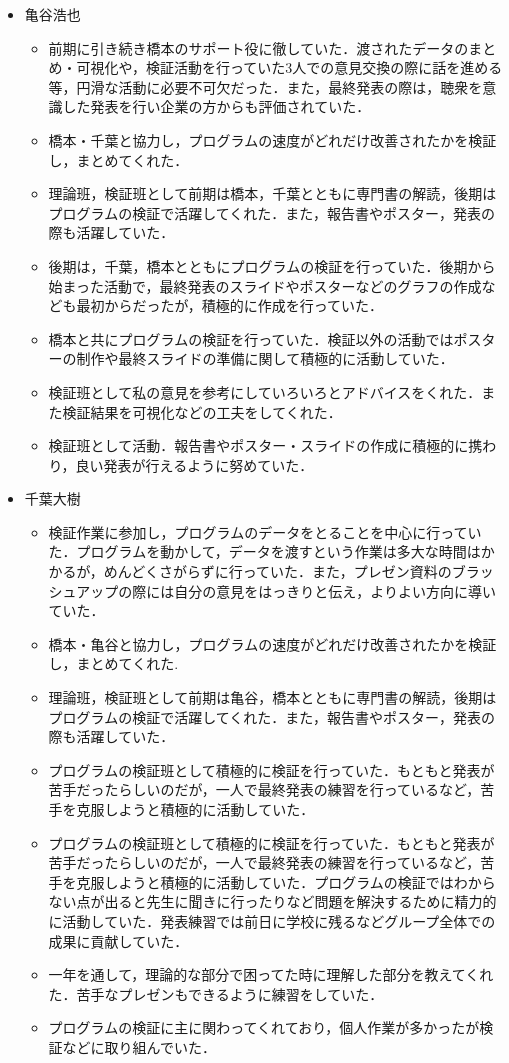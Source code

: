 \documentclass[openany,11pt,papersize]{jsbook}
\begin{document}
\begin{itemize}
\item 亀谷浩也
\begin{itemize}
\item 前期に引き続き橋本のサポート役に徹していた．渡されたデータのまとめ・可視化や，検証活動を行っていた3人での意見交換の際に話を進める等，円滑な活動に必要不可欠だった．また，最終発表の際は，聴衆を意識した発表を行い企業の方からも評価されていた．
\item 橋本・千葉と協力し，プログラムの速度がどれだけ改善されたかを検証し，まとめてくれた．
\item 理論班，検証班として前期は橋本，千葉とともに専門書の解読，後期はプログラムの検証で活躍してくれた．また，報告書やポスター，発表の際も活躍していた．
\item 後期は，千葉，橋本とともにプログラムの検証を行っていた．後期から始まった活動で，最終発表のスライドやポスターなどのグラフの作成なども最初からだったが，積極的に作成を行っていた．
\item 橋本と共にプログラムの検証を行っていた．検証以外の活動ではポスターの制作や最終スライドの準備に関して積極的に活動していた．
\item 検証班として私の意見を参考にしていろいろとアドバイスをくれた．また検証結果を可視化などの工夫をしてくれた．
\item 検証班として活動．報告書やポスター・スライドの作成に積極的に携わり，良い発表が行えるように努めていた．
\end{itemize}

\item 千葉大樹
\begin{itemize}
\item 検証作業に参加し，プログラムのデータをとることを中心に行っていた．プログラムを動かして，データを渡すという作業は多大な時間はかかるが，めんどくさがらずに行っていた．また，プレゼン資料のブラッシュアップの際には自分の意見をはっきりと伝え，よりよい方向に導いていた．
\item 橋本・亀谷と協力し，プログラムの速度がどれだけ改善されたかを検証し，まとめてくれた.
\item 理論班，検証班として前期は亀谷，橋本とともに専門書の解読，後期はプログラムの検証で活躍してくれた．また，報告書やポスター，発表の際も活躍していた．
\item プログラムの検証班として積極的に検証を行っていた．もともと発表が苦手だったらしいのだが，一人で最終発表の練習を行っているなど，苦手を克服しようと積極的に活動していた．
\item プログラムの検証班として積極的に検証を行っていた．もともと発表が苦手だったらしいのだが，一人で最終発表の練習を行っているなど，苦手を克服しようと積極的に活動していた．プログラムの検証ではわからない点が出ると先生に聞きに行ったりなど問題を解決するために精力的に活動していた．発表練習では前日に学校に残るなどグループ全体での成果に貢献していた．
\item 一年を通して，理論的な部分で困ってた時に理解した部分を教えてくれた．苦手なプレゼンもできるように練習をしていた．
\item プログラムの検証に主に関わってくれており，個人作業が多かったが検証などに取り組んでいた．
\end{itemize}

\end{itemize}

\end{document}
